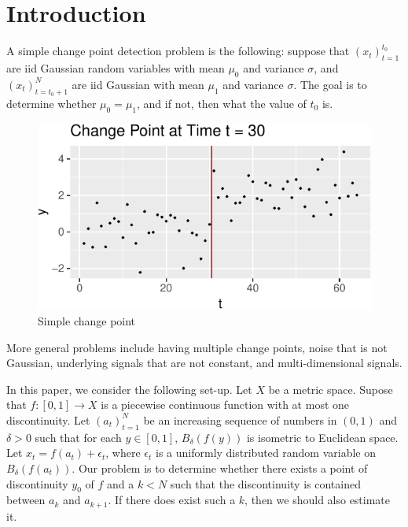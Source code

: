 \documentclass[smallextended]{svjour3}       %
\begin{document}
\section{Introduction}\label{intro}

A simple change point detection problem is the following: suppose that
\((x_t)_{t = 1}^{t_0}\) are iid Gaussian random variables with mean
\(\mu_0\) and variance \(\sigma\), and \((x_t)_{t = t_0 + 1}^N\) are iid
Gaussian with mean \(\mu_1\) and variance \(\sigma\). The goal is to
determine whether \(\mu_0 = \mu_1\), and if not, then what the value of
\(t_0\) is.

\begin{figure}[h!]\includegraphics{springer_template_files/figure-latex/chunk_1-1} \caption{Simple change point}\label{fig:1}\end{figure}

More general problems include having multiple change points, noise that
is not Gaussian, underlying signals that are not constant, and
multi-dimensional signals.

In this paper, we consider the following set-up. Let \(X\) be a metric
space. Supose that \(f:[0,1]\to X\) is a piecewise continuous function
with at most one discontinuity. Let \((a_t)_{t = 1}^N\) be an increasing
sequence of numbers in \((0, 1)\) and \(\delta > 0\) such that for each
\(y\in [0,1]\), \(B_\delta(f(y))\) is isometric to Euclidean space. Let
\(x_t = f(a_t) + \epsilon_t\), where \(\epsilon_t\) is a uniformly
distributed random variable on \(B_\delta(f(a_t))\). Our problem is to
determine whether there exists a point of discontinuity \(y_0\) of \(f\)
and a \(k < N\) such that the discontinuity is contained between \(a_k\)
and \(a_{k +1}\). If there does exist such a \(k\), then we should also
estimate it.
\end{document}
